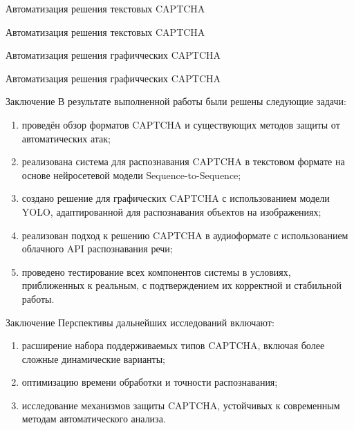 \documentclass[12pt,a4paper,mathserif]{beamer}
\begin{document}
\begin{frame}{Автоматизация решения текстовых CAPTCHA}
    \setlength{\parindent}{0.5cm}
    
\end{frame}

\begin{frame}{Автоматизация решения текстовых CAPTCHA}
    \setlength{\parindent}{0.5cm}
    
\end{frame}

\begin{frame}{Автоматизация решения графичческих CAPTCHA}
    \setlength{\parindent}{0.5cm}
    
\end{frame}

\begin{frame}{Автоматизация решения графичческих CAPTCHA}
    \setlength{\parindent}{0.5cm}
    
\end{frame}

\begin{frame}{Заключение}
    \setlength{\parindent}{0.5cm}
    В результате выполненной работы были решены следующие задачи:

    \begin{enumerate}
        \item проведён обзор форматов CAPTCHA и существующих методов защиты от 
        автоматических атак;
        \item реализована система для распознавания CAPTCHA в текстовом формате 
        на основе нейросетевой модели Sequence-to-Sequence;
        \item создано решение для графических CAPTCHA с использованием модели 
        YOLO, адаптированной для распознавания объектов на изображениях;
        \item реализован подход к решению CAPTCHA в аудиоформате с использованием 
        облачного API распознавания речи;
        \item проведено тестирование всех компонентов системы в условиях, 
        приближенных к реальным, с подтверждением их корректной и стабильной 
        работы.
    \end{enumerate}
\end{frame}

\begin{frame}{Заключение}
    \setlength{\parindent}{0.5cm}
    Перспективы дальнейших исследований включают:

    \begin{enumerate}
        \item расширение набора поддерживаемых типов CAPTCHA, включая более 
        сложные динамические варианты;
        \item оптимизацию времени обработки и точности распознавания;
        \item исследование механизмов защиты CAPTCHA, устойчивых к современным 
        методам автоматического анализа.
    \end{enumerate}
\end{frame}
\end{document}

